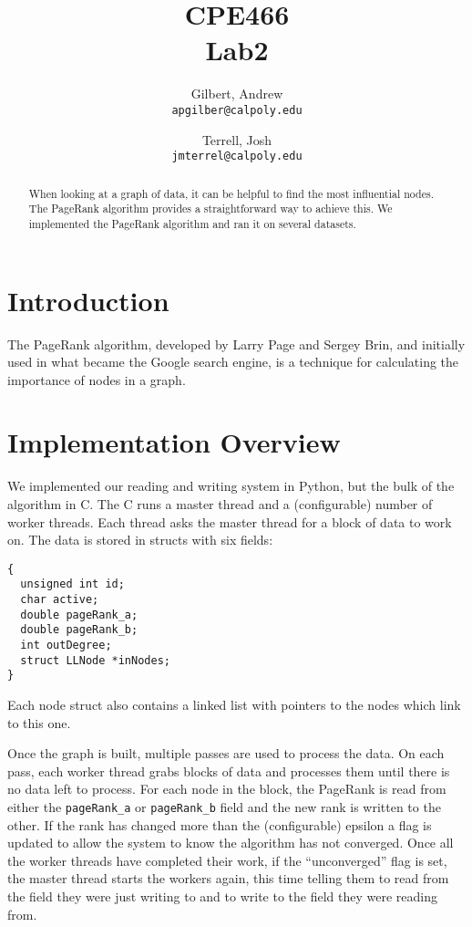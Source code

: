 \documentclass{report}
\title{CPE466\\Lab2}
\author{
  Gilbert, Andrew\\
  \texttt{apgilber@calpoly.edu}
  \and
  Terrell, Josh\\
  \texttt{jmterrel@calpoly.edu}
}
\date{}
\begin{document}
\maketitle

\begin{abstract}
  When looking at a graph of data, it can be helpful to find the most
influential nodes. The PageRank algorithm provides a straightforward
way to achieve this. We implemented the PageRank algorithm and ran it
on several datasets.
\end{abstract}

\section{Introduction}
The PageRank algorithm, developed by Larry Page and Sergey Brin, and
initially used in what became the Google search engine, is a technique
for calculating the importance of nodes in a graph.



\section{Implementation Overview}
We implemented our reading and writing system in Python, but the bulk
of the algorithm in C. The C runs a master thread and a (configurable)
number of worker threads. Each thread asks the master thread for a
block of data to work on. The data is stored in structs with six
fields:
\begin{lstlisting}[lang=ANSI]
{
  unsigned int id;
  char active;
  double pageRank_a;
  double pageRank_b;
  int outDegree;
  struct LLNode *inNodes;
}
\end{lstlisting}
Each node struct also contains a linked list with pointers to the nodes which link to this one.

Once the graph is built, multiple passes are used to process the
data. On each pass, each worker thread grabs blocks of data and processes them until there is no data left to process.
For each node in the block, the PageRank is read from either the
\texttt{pageRank_a} or \texttt{pageRank_b} field and the new rank is
written to the other. If the rank has changed more than the (configurable) epsilon %
a flag is updated to allow the system to know the algorithm has not
converged. Once all the worker threads have completed their work, if
the ``unconverged'' flag is set, the master thread starts the workers
again, this time telling them to read from the field they were just
writing to and to write to the field they were reading from.
\end{document}
